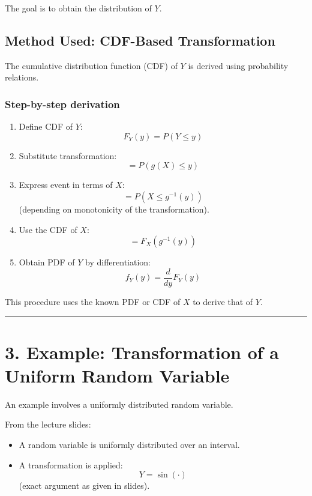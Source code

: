 \documentclass[11pt]{article}
\begin{document}
The goal is to obtain the distribution of \(Y\).

\subsection*{Method Used: CDF-Based Transformation}

The cumulative distribution function (CDF) of \(Y\) is derived using probability relations.

\subsubsection*{Step-by-step derivation}

\begin{enumerate}
    \item Define CDF of \(Y\):
    \[
    F_Y(y) = P(Y \le y)
    \]

    \item Substitute transformation:
    \[
    = P(g(X) \le y)
    \]

    \item Express event in terms of \(X\):
    \[
    = P(X \le g^{-1}(y))
    \]
    (depending on monotonicity of the transformation).

    \item Use the CDF of \(X\):
    \[
    = F_X(g^{-1}(y))
    \]

    \item Obtain PDF of \(Y\) by differentiation:
    \[
    f_Y(y) = \frac{d}{dy} F_Y(y)
    \]
\end{enumerate}

This procedure uses the known PDF or CDF of \(X\) to derive that of \(Y\).

\hrule
\vspace{0.5em}

\section*{3. Example: Transformation of a Uniform Random Variable}

An example involves a uniformly distributed random variable.

From the lecture slides:

\begin{itemize}
    \item A random variable is uniformly distributed over an interval.
    \item A transformation is applied:
    \[
    Y = \sin(\cdot)
    \]
    (exact argument as given in slides).
\end{itemize}
\end{document}
